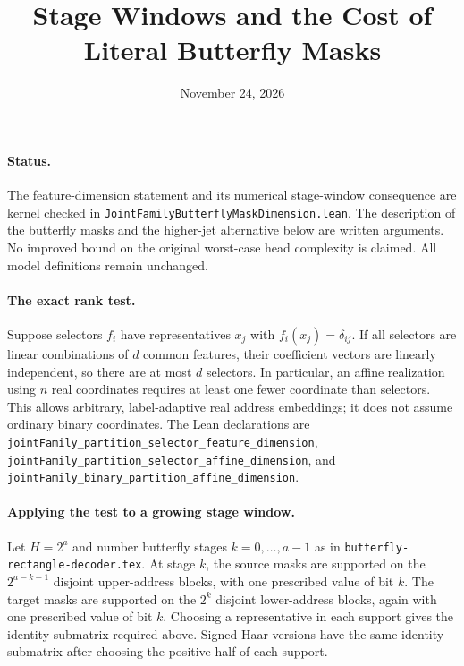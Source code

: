 \documentclass[11pt]{article}
\begin{document}
\title{Stage Windows and the Cost of Literal Butterfly Masks}
\author{}\date{November 24, 2026}\maketitle

\paragraph{Status.}
The feature-dimension statement and its numerical stage-window consequence
are kernel checked in
\texttt{JointFamilyButterflyMaskDimension.lean}. The description of the
butterfly masks and the higher-jet alternative below are written arguments.
No improved bound on the original worst-case head complexity is claimed.
All model definitions remain unchanged.

\paragraph{The exact rank test.}
Suppose selectors $f_i$ have representatives $x_j$ with
$f_i(x_j)=\delta_{ij}$. If all selectors are linear combinations of
$d$ common features, their coefficient vectors are linearly independent,
so there are at most $d$ selectors. In particular, an affine realization
using $n$ real coordinates requires at least one fewer coordinate than
selectors. This allows arbitrary, label-adaptive real address embeddings;
it does not assume ordinary binary coordinates.
The Lean declarations are
\texttt{jointFamily\_partition\_selector\_feature\_dimension},
\texttt{jointFamily\_partition\_selector\_affine\_dimension}, and
\texttt{jointFamily\_binary\_partition\_affine\_dimension}.

\paragraph{Applying the test to a growing stage window.}
Let $H=2^a$ and number butterfly stages $k=0,\ldots,a-1$ as in
\texttt{butterfly-rectangle-decoder.tex}. At stage $k$, the source masks
are supported on the $2^{a-k-1}$ disjoint upper-address blocks, with
one prescribed value of bit $k$. The target masks are supported on the
$2^k$ disjoint lower-address blocks, again with one prescribed value of
bit $k$. Choosing a representative in each support gives the identity
submatrix required above. Signed Haar versions have the same identity
submatrix after choosing the positive half of each support.
\end{document}
